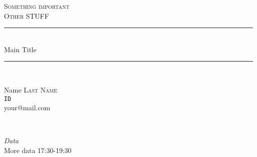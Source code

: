 \begin{titlepage}

\newcommand{\HRule}{\rule{\linewidth}{0.7mm}}

\center


\textsc{\Huge Something important}\\[2.5cm]
\textsc{\LARGE Other STUFF}\\[3cm]



\HRule \\[1cm]
{\fontsize{55}{60}\selectfont \sffamily Main Title}\\[0.6cm]
\HRule \\[8.2cm]



\begin{minipage}{0.4\textwidth}
\begin{flushleft} \large
Name \textsc{Last Name}\\ %
\texttt{ID}\\
your@mail.com
\end{flushleft}
\end{minipage}
~
\begin{minipage}{0.4\textwidth}
\begin{flushright} \large
\emph{Data} \\
More data 17:30-19:30
\end{flushright}
\end{minipage}\\[4cm]


\end{titlepage}

